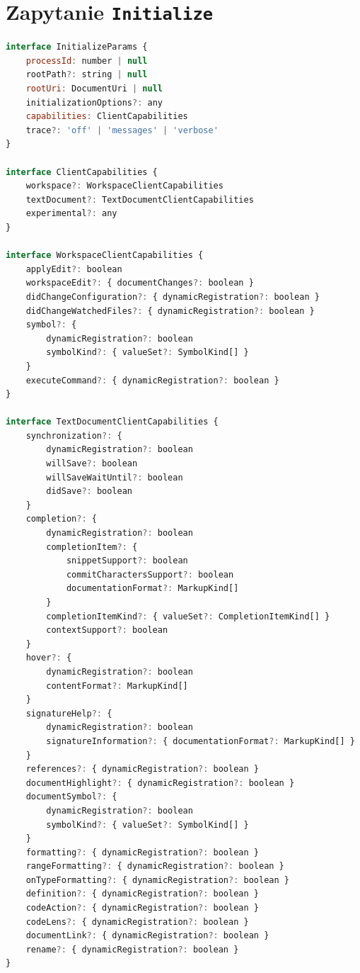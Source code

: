 \section{Zapytanie \texttt{Initialize}}
\begin{lstlisting}[language=JavaScript, basicstyle=\fontsize{9}{10}\ttfamily, title=Struktura argumentu zapytania]
interface InitializeParams {
    processId: number | null
    rootPath?: string | null
    rootUri: DocumentUri | null
    initializationOptions?: any
    capabilities: ClientCapabilities
    trace?: 'off' | 'messages' | 'verbose'
}

interface ClientCapabilities {
    workspace?: WorkspaceClientCapabilities
    textDocument?: TextDocumentClientCapabilities
    experimental?: any
}

interface WorkspaceClientCapabilities {
    applyEdit?: boolean
    workspaceEdit?: { documentChanges?: boolean }
    didChangeConfiguration?: { dynamicRegistration?: boolean }
    didChangeWatchedFiles?: { dynamicRegistration?: boolean }
    symbol?: {
        dynamicRegistration?: boolean
        symbolKind?: { valueSet?: SymbolKind[] }
    }
    executeCommand?: { dynamicRegistration?: boolean }
}

interface TextDocumentClientCapabilities {
    synchronization?: {
        dynamicRegistration?: boolean
        willSave?: boolean
        willSaveWaitUntil?: boolean
        didSave?: boolean
    }
    completion?: {
        dynamicRegistration?: boolean
        completionItem?: {
            snippetSupport?: boolean
            commitCharactersSupport?: boolean
            documentationFormat?: MarkupKind[]
        }
        completionItemKind?: { valueSet?: CompletionItemKind[] }
        contextSupport?: boolean		
    }
    hover?: {
        dynamicRegistration?: boolean
        contentFormat?: MarkupKind[]
    }
    signatureHelp?: {
        dynamicRegistration?: boolean
        signatureInformation?: { documentationFormat?: MarkupKind[] }
    }
    references?: { dynamicRegistration?: boolean }
    documentHighlight?: { dynamicRegistration?: boolean }
    documentSymbol?: {
        dynamicRegistration?: boolean
        symbolKind?: { valueSet?: SymbolKind[] }
    }
    formatting?: { dynamicRegistration?: boolean }
    rangeFormatting?: { dynamicRegistration?: boolean }
    onTypeFormatting?: { dynamicRegistration?: boolean }
    definition?: { dynamicRegistration?: boolean }
    codeAction?: { dynamicRegistration?: boolean }
    codeLens?: { dynamicRegistration?: boolean }
    documentLink?: { dynamicRegistration?: boolean }
	rename?: { dynamicRegistration?: boolean }
}
\end{lstlisting}

